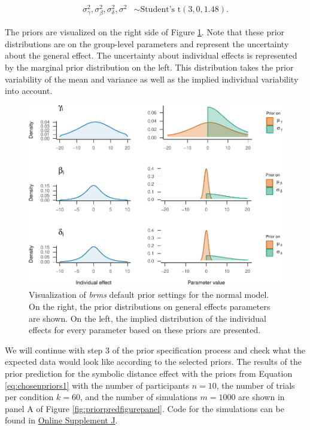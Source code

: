 \documentclass[
  english,
  doc,floatsintext]{apa6}
\begin{document}
\begin{equation}
\begin{aligned}
\sigma_{\gamma}^2, \sigma_{\beta}^2, \sigma_{\delta}^2, \sigma^2 &\sim \text{Student's t}(3, 0, 1.48). 
\end{aligned}
\end{equation}

The priors are visualized on the right side of Figure \ref{fig:priorvisualizationbrms2}. Note that these prior distributions are on the group-level parameters and represent the uncertainty about the general effect. The uncertainty about individual effects is represented by the marginal prior distribution on the left. This distribution takes the prior variability of the mean and variance as well as the implied individual variability into account.

\begin{figure}[H]

\includegraphics{manuscript_files/figure-latex/priorvisualizationbrms2-1} \hfill{}

\caption{Visualization of \textit{brms} default prior settings for the normal model. On the right, the prior distributions on general effects parameters are shown. On the left, the implied distribution of the individual effects for every parameter based on these priors are presented. }\label{fig:priorvisualizationbrms2}
\end{figure}

We will continue with step 3 of the prior specification process and check what the expected data would look like according to the selected priors. The results of the prior prediction for the symbolic distance effect with the priors from Equation \eqref{eq:chosenpriors1} with the number of participants \(n = 10\), the number of trials per condition \(k = 60\), and the number of simulations \(m = 1000\) are shown in panel A of Figure \ref{fig:priorpredfigurepanel}. Code for the simulations can be found in \href{https://github.com/MyrtheV/Bayesian-Hierarchical-Modelling-An-Introduction-and-Reassessment/blob/main/R\%20code/Figures/Fig5_priorpredictions_trunc_v3.R}{Online Supplement J}.
\end{document}
